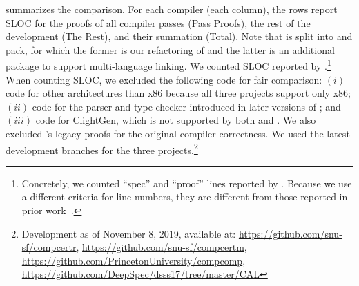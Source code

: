  summarizes the comparison.
For each compiler (\ie each column),
the rows report SLOC for the proofs of all compiler passes (Pass Proofs),
the rest of the development (The Rest),
and their summation (Total).
Note that \ccm{} is split into \ccr{} and \ccm{} pack, for which the former is our refactoring
of \cc{} and the latter is an additional package to support multi-language linking.
We counted SLOC reported by
.\footnote{Concretely, we counted ``spec'' and ``proof'' lines reported by .
  Because we use a different criteria for line numbers, they are different from those reported in
  prior work~\cite{stewart:ccc,gu:dscal,wang:saccx}.}  When counting SLOC, we excluded the following
code for fair comparison: $(i)$ code for other architectures than x86 because all three projects support
only x86; $(ii)$ code for the parser and type checker introduced in later versions of \cc{}; and $(iii)$ code for \textrm{ClightGen}, which is not supported by both \ccx{} and
\ccc{}.  We also excluded \ccc{}'s legacy proofs for the original compiler correctness.  We used the
latest development branches for the three projects.\footnote{Development as of November 8, 2019, available at: \url{https://github.com/snu-sf/compcertr}, \url{https://github.com/snu-sf/compcertm}, \url{https://github.com/PrincetonUniversity/compcomp}, \url{https://github.com/DeepSpec/dsss17/tree/master/CAL}}





